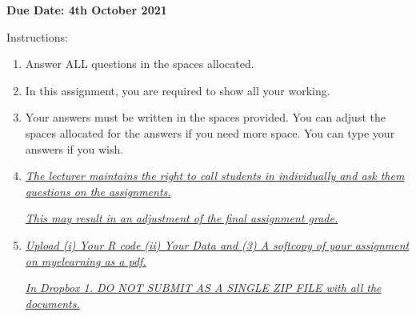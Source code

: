 \documentclass{article}
\begin{document}
    
    \textbf{Due Date: 4th October 2021}
    
    Instructions:
    
    \begin{enumerate}
        \item Answer ALL questions in the spaces allocated.
        \item In this assignment, you are required to show all your working. 
        \item Your answers must be written in the spaces provided. You can adjust the spaces allocated for the answers if you need more space. You can type your answers if you wish. 
        \item \emph{\underline{The lecturer maintains the right to call students in individually and ask them questions on the assignments.}} 
        
        \emph{\underline{This may result in an adjustment of the final assignment grade.}}
        
        \item \emph{\underline{Upload  (i) Your R code (ii) Your Data and (3) A softcopy of your assignment on myelearning as a pdf. }} 

        \emph{\underline{In Dropbox 1. DO NOT SUBMIT AS A SINGLE ZIP FILE with all the documents.}}
    \end{enumerate}
    
    \vspace{2cm}
    
\end{document}
